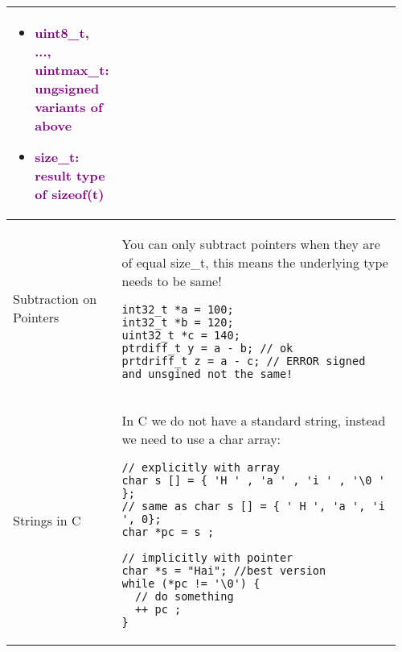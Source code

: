\documentclass[main.tex,fontsize=8pt,paper=a4,paper=portrait,DIV=calc,]{scrartcl}
\begin{document}
\begin{table}[ht!]
\begin{tabular}{|m{0.2\linewidth}|m{0.755\linewidth}|}
\begin{itemize}
\item \textcolor{purple}{uint8\_t, ..., uintmax\_t: ungsigned variants of above}
\item \textcolor{purple}{size\_t: result type of sizeof(t)}
\vspace{-3mm}
\end{itemize}\\ 
\hline
Subtraction on Pointers & 
You can only subtract pointers when they are of equal size\_t, this means the underlying type needs to be same!\newline
\begin{lstlisting}
int32_t *a = 100;
int32_t *b = 120;
uint32_t *c = 140;
ptrdiff_t y = a - b; // ok
prtdriff_t z = a - c; // ERROR signed and unsgined not the same!
\end{lstlisting}\\
\hline
Strings in C & 
In C we do not have a standard string, instead we need to use a char array:\newline
\begin{lstlisting}
// explicitly with array
char s [] = { 'H ' , 'a ' , 'i ' , '\0 ' };
// same as char s [] = { ' H ', 'a ', 'i ', 0};
char *pc = s ;

// implicitly with pointer
char *s = "Hai"; //best version
while (*pc != '\0') {
  // do something
  ++ pc ;
}
\end{lstlisting}\\
\hline
\end{tabular}
\end{table}
\pagebreak
\end{document}
